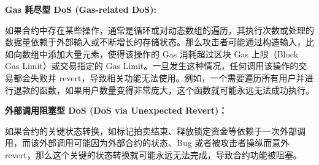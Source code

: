 \documentclass[print, master, vlined, timesmath]{DissertUESTC}
\begin{document}
\textbf{Gas 耗尽型 DoS (Gas-related DoS):}

如果合约中存在某些操作，通常是循环或对动态数组的遍历，其执行次数或处理的数据量依赖于外部输入或不断增长的存储状态。那么攻击者可能通过构造输入，比如向数组中添加大量元素，使得该操作的 Gas 消耗超过区块 Gas 上限（Block Gas Limit）或交易指定的 Gas Limit。一旦发生这种情况，任何调用该操作的交易都会失败并 revert，导致相关功能无法使用。例如，一个需要遍历所有用户并进行退款的函数，如果用户数量变得非常庞大，这个函数就可能永远无法成功执行。

\textbf{外部调用阻塞型 DoS (DoS via Unexpected Revert)：}

如果合约的关键状态转换，如标记拍卖结束、释放锁定资金等依赖于一次外部调用，而该外部调用可能因为外部合约的状态、Bug 或者被攻击者操纵而意外 revert，那么这个关键的状态转换就可能永远无法完成，导致合约功能被阻塞。


\end{document}
